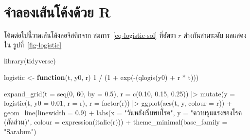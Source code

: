 \documentclass[
  11pt,
  a4paper,
  twoside,
  openright]{scrbook}
\newenvironment{Shaded}{\begin{snugshade}}{\end{snugshade}}
\newcommand{\AttributeTok}[1]{\textcolor[rgb]{0.40,0.45,0.13}{#1}}
\newcommand{\ControlFlowTok}[1]{\textcolor[rgb]{0.00,0.23,0.31}{\textbf{#1}}}
\newcommand{\DecValTok}[1]{\textcolor[rgb]{0.68,0.00,0.00}{#1}}
\newcommand{\FloatTok}[1]{\textcolor[rgb]{0.68,0.00,0.00}{#1}}
\newcommand{\FunctionTok}[1]{\textcolor[rgb]{0.28,0.35,0.67}{#1}}
\newcommand{\NormalTok}[1]{\textcolor[rgb]{0.00,0.23,0.31}{#1}}
\newcommand{\OtherTok}[1]{\textcolor[rgb]{0.00,0.23,0.31}{#1}}
\newcommand{\SpecialCharTok}[1]{\textcolor[rgb]{0.37,0.37,0.37}{#1}}
\newcommand{\StringTok}[1]{\textcolor[rgb]{0.13,0.47,0.30}{#1}}
\begin{document}
\section{จำลองเส้นโค้งด้วย
R}\label{uxe08uxe33uxe25uxe2duxe07uxe40uxe2auxe19uxe42uxe04uxe07uxe14uxe27uxe22-r}

โค้ดต่อไปนี้วาดเส้นโค้งลอจิสติกจาก สมการ~\ref{eq-logistic-sol} ที่อัตรา \(r\)
ต่างกันสามระดับ ผลแสดงใน รูปที่~\ref{fig-logistic}

\begin{Shaded}
\begin{Highlighting}[]
\FunctionTok{library}\NormalTok{(tidyverse)}

\NormalTok{logistic }\OtherTok{\textless{}{-}} \ControlFlowTok{function}\NormalTok{(t, y0, r) }\DecValTok{1} \SpecialCharTok{/}\NormalTok{ (}\DecValTok{1} \SpecialCharTok{+} \FunctionTok{exp}\NormalTok{(}\SpecialCharTok{{-}}\NormalTok{(}\FunctionTok{qlogis}\NormalTok{(y0) }\SpecialCharTok{+}\NormalTok{ r }\SpecialCharTok{*}\NormalTok{ t)))}

\FunctionTok{expand\_grid}\NormalTok{(}\AttributeTok{t =} \FunctionTok{seq}\NormalTok{(}\DecValTok{0}\NormalTok{, }\DecValTok{60}\NormalTok{, }\AttributeTok{by =} \FloatTok{0.5}\NormalTok{), }\AttributeTok{r =} \FunctionTok{c}\NormalTok{(}\FloatTok{0.10}\NormalTok{, }\FloatTok{0.15}\NormalTok{, }\FloatTok{0.25}\NormalTok{)) }\SpecialCharTok{|\textgreater{}}
  \FunctionTok{mutate}\NormalTok{(}\AttributeTok{y =} \FunctionTok{logistic}\NormalTok{(t, }\AttributeTok{y0 =} \FloatTok{0.01}\NormalTok{, }\AttributeTok{r =}\NormalTok{ r),}
         \AttributeTok{r =} \FunctionTok{factor}\NormalTok{(r)) }\SpecialCharTok{|\textgreater{}}
  \FunctionTok{ggplot}\NormalTok{(}\FunctionTok{aes}\NormalTok{(t, y, }\AttributeTok{colour =}\NormalTok{ r)) }\SpecialCharTok{+}
  \FunctionTok{geom\_line}\NormalTok{(}\AttributeTok{linewidth =} \FloatTok{0.9}\NormalTok{) }\SpecialCharTok{+}
  \FunctionTok{labs}\NormalTok{(}\AttributeTok{x =} \StringTok{"วันหลังเริ่มพบโรค"}\NormalTok{, }\AttributeTok{y =} \StringTok{"ความรุนแรงของโรค (สัดส่วน)"}\NormalTok{,}
       \AttributeTok{colour =} \FunctionTok{expression}\NormalTok{(}\FunctionTok{italic}\NormalTok{(r))) }\SpecialCharTok{+}
  \FunctionTok{theme\_minimal}\NormalTok{(}\AttributeTok{base\_family =} \StringTok{"Sarabun"}\NormalTok{)}
\end{Highlighting}
\end{Shaded}
\end{document}
